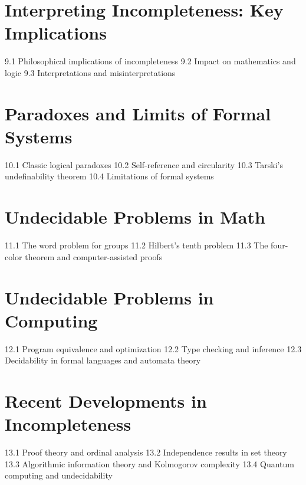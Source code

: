 \section{Interpreting Incompleteness: Key Implications}
9.1 Philosophical implications of incompleteness
9.2 Impact on mathematics and logic
9.3 Interpretations and misinterpretations
\section{Paradoxes and Limits of Formal Systems}
10.1 Classic logical paradoxes
10.2 Self-reference and circularity
10.3 Tarski's undefinability theorem
10.4 Limitations of formal systems
\section{Undecidable Problems in Math}
11.1 The word problem for groups
11.2 Hilbert's tenth problem
11.3 The four-color theorem and computer-assisted proofs
\section{Undecidable Problems in Computing}
12.1 Program equivalence and optimization
12.2 Type checking and inference
12.3 Decidability in formal languages and automata theory
\section{Recent Developments in Incompleteness}
13.1 Proof theory and ordinal analysis
13.2 Independence results in set theory
13.3 Algorithmic information theory and Kolmogorov complexity
13.4 Quantum computing and undecidability
